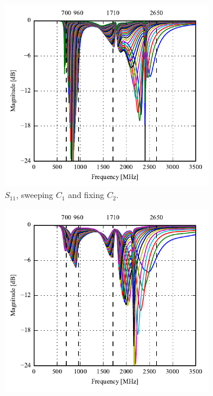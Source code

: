   \begin{figure}[htbp]
    \begin{subfigure}[b]{0.49\linewidth}
      \centering
      \includegraphics{img/tech_sol/monopole/highband/ue/playmode/s11.pdf}
      \caption{$S_{11}$, sweeping $C_1$ and fixing $C_2$.}
    \end{subfigure}
    \hfill
    \begin{subfigure}[b]{0.49\linewidth}
        \centering
        \includegraphics{img/tech_sol/monopole/highband/ue/playmode/s22.pdf}

\end{subfigure}
\end{figure}
